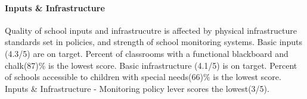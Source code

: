 \documentclass[twocolumn]{article}
\let\oldparagraph\paragraph
\renewcommand{\paragraph}[1]{\oldparagraph{#1}\mbox{}}
\begin{document}
\hypertarget{inputs-infrastructure}{%
\paragraph{\texorpdfstring{\textbf{Inputs \&
Infrastructure}}{Inputs \& Infrastructure}}\label{inputs-infrastructure}}

Quality of school inputs and infrastrucutre is affected by physical
infrastructure standards set in policies, and strength of school
monitoring systems. Basic inputs (4.3/5) are on target. Percent of
classrooms with a functional blackboard and chalk(87)\% is the lowest
score. Basic infrastructure (4.1/5) is on target. Percent of schools
accessible to children with special needs(66)\% is the lowest score.
Inputs \& Infrastructure - Monitoring policy lever scores the
lowest(3/5).
\end{document}
